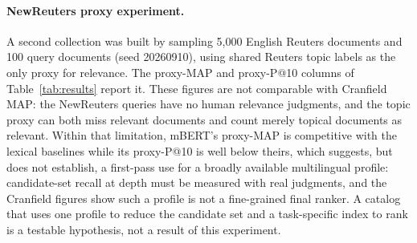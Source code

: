 \documentclass[sigconf]{acmart}
\begin{document}
\paragraph{NewReuters proxy experiment.} A second collection was built by
sampling 5,000 English Reuters documents and 100 query documents (seed
20260910), using shared Reuters topic labels as the only proxy for relevance.
The proxy-MAP and proxy-P@10 columns of Table~\ref{tab:results} report it.
These figures are not comparable with Cranfield MAP: the NewReuters queries
have no human relevance judgments, and the topic proxy can both miss relevant
documents and count merely topical documents as relevant. Within that
limitation, mBERT's proxy-MAP is competitive with the lexical baselines while
its proxy-P@10 is well below theirs, which suggests, but does not establish,
a first-pass use for a broadly available multilingual profile: candidate-set
recall at depth must be measured with real judgments, and the Cranfield
figures show such a profile is not a fine-grained final ranker. A catalog
that uses one profile to reduce the candidate set and a task-specific index
to rank is a testable hypothesis, not a result of this experiment.

\begingroup\sloppy
\end{document}

